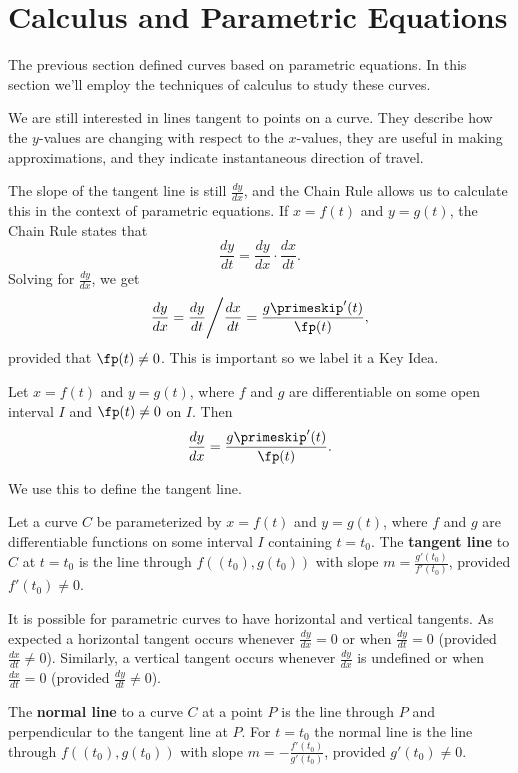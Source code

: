 \section{Calculus and Parametric Equations}\label{sec:par_calc}

The previous section defined curves based on parametric equations. In this section we'll employ the techniques of calculus to study these curves.

We are still interested in lines tangent to points on a curve. They describe how the $y$-values are changing with respect to the $x$-values, they are useful in making approximations, and they indicate instantaneous direction of travel.

The slope of the tangent line is still $\frac{dy}{dx}$, and the Chain Rule allows us to calculate this in the context of parametric equations. If $x=f(t)$ and $y=g(t)$, the Chain Rule states that $$\frac{dy}{dt} = \frac{dy}{dx}\cdot\frac{dx}{dt}.$$
Solving for $\frac{dy}{dx}$, we get 
$$\frac{dy}{dx} = \frac{dy}{dt}\Bigg/\frac{dx}{dt} = \frac{g\primeskip'(t)}{\fp(t)},$$
provided that $\fp(t)\neq 0$. This is important so we label it a Key Idea.

{Let $x=f(t)$ and $y=g(t)$, where $f$ and $g$ are differentiable on some open interval $I$ and $\fp(t)\neq 0$ on $I$. Then 
$$\frac{dy}{dx} = \frac{g\primeskip'(t)}{\fp(t)}.$$}

We use this to define the tangent line.

{Let a curve $C$ be parameterized by $x=f(t)$ and $y=g(t)$, where $f$ and $g$ are differentiable functions on some interval $I$ containing $t=t_0$. The 
\textbf{tangent line} to $C$ at $t=t_0$ is the line through $f((t_0),g(t_0))$ with slope $m=\frac{g'(t_0)}{f'(t_0)}$, provided $f'(t_0) \neq 0$.}

It is possible for parametric curves to have horizontal and vertical tangents. As expected a horizontal tangent occurs whenever $\frac{dy}{dx} = 0$ or when $\frac{dy}{dt} = 0$ (provided $\frac{dx}{dt} \neq 0$). Similarly, a vertical tangent occurs whenever $\frac{dy}{dx}$ is undefined or when $\frac{dx}{dt} = 0$ (provided $\frac{dy}{dt} \neq 0$).

{The \textbf{normal line} to a curve $C$ at a point $P$ is the line through $P$ and perpendicular to the tangent line at $P$. For $t=t_0$ the normal line is the line through $f((t_0), g(t_0))$ with slope $m=-\frac{f'(t_0)}{g'(t_0)}$, provided $g'(t_0) \neq 0$.}

